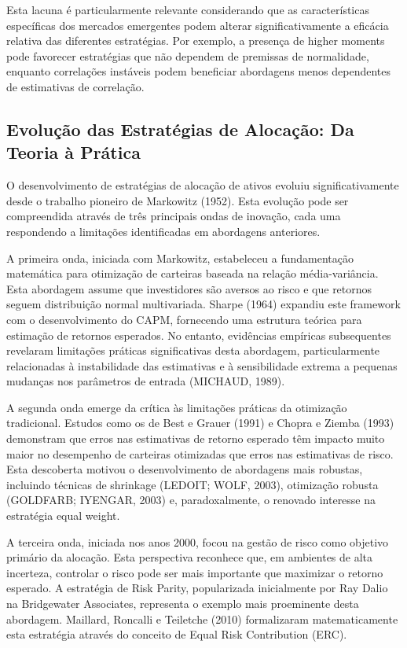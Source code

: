 Esta lacuna é particularmente relevante considerando que as características específicas dos mercados emergentes podem alterar significativamente a eficácia relativa das diferentes estratégias. Por exemplo, a presença de higher moments pode favorecer estratégias que não dependem de premissas de normalidade, enquanto correlações instáveis podem beneficiar abordagens menos dependentes de estimativas de correlação.

\subsection{Evolução das Estratégias de Alocação: Da Teoria à Prática}

O desenvolvimento de estratégias de alocação de ativos evoluiu significativamente desde o trabalho pioneiro de Markowitz (1952). Esta evolução pode ser compreendida através de três principais ondas de inovação, cada uma respondendo a limitações identificadas em abordagens anteriores.

A primeira onda, iniciada com Markowitz, estabeleceu a fundamentação matemática para otimização de carteiras baseada na relação média-variância. Esta abordagem assume que investidores são aversos ao risco e que retornos seguem distribuição normal multivariada. Sharpe (1964) expandiu este framework com o desenvolvimento do CAPM, fornecendo uma estrutura teórica para estimação de retornos esperados. No entanto, evidências empíricas subsequentes revelaram limitações práticas significativas desta abordagem, particularmente relacionadas à instabilidade das estimativas e à sensibilidade extrema a pequenas mudanças nos parâmetros de entrada (MICHAUD, 1989).

A segunda onda emerge da crítica às limitações práticas da otimização tradicional. Estudos como os de Best e Grauer (1991) e Chopra e Ziemba (1993) demonstram que erros nas estimativas de retorno esperado têm impacto muito maior no desempenho de carteiras otimizadas que erros nas estimativas de risco. Esta descoberta motivou o desenvolvimento de abordagens mais robustas, incluindo técnicas de shrinkage (LEDOIT; WOLF, 2003), otimização robusta (GOLDFARB; IYENGAR, 2003) e, paradoxalmente, o renovado interesse na estratégia equal weight.

A terceira onda, iniciada nos anos 2000, focou na gestão de risco como objetivo primário da alocação. Esta perspectiva reconhece que, em ambientes de alta incerteza, controlar o risco pode ser mais importante que maximizar o retorno esperado. A estratégia de Risk Parity, popularizada inicialmente por Ray Dalio na Bridgewater Associates, representa o exemplo mais proeminente desta abordagem. Maillard, Roncalli e Teiletche (2010) formalizaram matematicamente esta estratégia através do conceito de Equal Risk Contribution (ERC).

